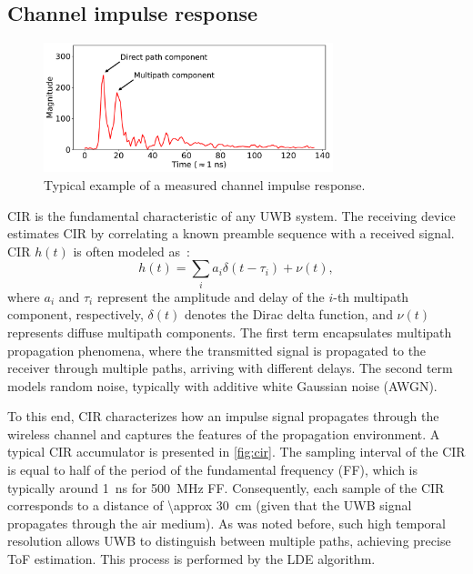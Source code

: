 \subsection{Channel impulse response}\label{cir_theory}

\begin{figure}[tbh]
\includegraphics[width=0.75\textwidth]{Figures/theoretical_background/cir_sample.pdf}
\centering
\caption{Typical example of a measured channel impulse response.}
\label{fig:cir}
\end{figure}

CIR is the fundamental characteristic of any UWB system. The receiving device estimates CIR by correlating a known preamble sequence with a received signal. CIR $h(t)$ is often modeled as~\cite{cheraghinia2024comprehensive}:
\begin{equation}
h(t) = \sum_{i} a_i \delta(t - \tau_i) + \nu(t),
\end{equation}
where $a_i$ and $\tau_i$ represent the amplitude and delay of the $i$-th multipath component, respectively, $\delta(t)$ denotes the Dirac delta function, and $\nu(t)$ represents diffuse multipath components. The first term encapsulates multipath propagation phenomena, where the transmitted signal is propagated to the receiver through multiple paths, arriving with different delays. The second term models random noise, typically with additive white Gaussian noise (AWGN).

To this end, CIR characterizes how an impulse signal propagates through the wireless channel and captures the features of the propagation environment. A typical CIR accumulator is presented in \autoref{fig:cir}. The sampling interval of the CIR is equal to half of the period of the fundamental frequency (FF), which is typically around \SI{1}{\nano\second} for \SI{500}{\mega\hertz} FF. Consequently, each sample of the CIR corresponds to a distance of \SI{\approx 30}{\centi\metre} (given that the UWB signal propagates through the air medium). As was noted before, such high temporal resolution allows UWB to distinguish between multiple paths, achieving precise ToF estimation. This process is performed by the LDE algorithm.

